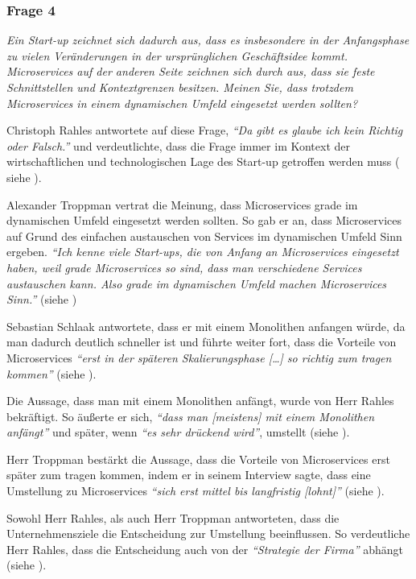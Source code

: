\subsubsection{Frage 4}

\textit{Ein Start-up zeichnet sich dadurch aus, dass es insbesondere in der Anfangsphase zu vielen Veränderungen in der ursprünglichen Geschäftsidee kommt. Microservices auf der anderen Seite zeichnen sich durch aus, dass sie feste Schnittstellen und Kontextgrenzen besitzen. Meinen Sie, dass trotzdem Microservices in einem dynamischen Umfeld eingesetzt werden sollten?}

Christoph Rahles antwortete auf diese Frage, \textit{\enquote{Da gibt es glaube ich kein Richtig oder Falsch.}} und verdeutlichte, dass die Frage immer im Kontext der wirtschaftlichen und technologischen Lage des Start-up getroffen werden muss ( siehe ).

Alexander Troppman vertrat die Meinung, dass Microservices grade im dynamischen Umfeld eingesetzt werden sollten. So gab er an, dass Microservices auf Grund des einfachen austauschen von Services im dynamischen Umfeld Sinn ergeben.
\textit{\enquote{Ich kenne viele Start-ups, die von Anfang an Microservices eingesetzt haben, weil grade Microservices so sind, dass man verschiedene Services austauschen kann. Also grade im dynamischen Umfeld machen Microservices Sinn.}} (siehe )

Sebastian Schlaak antwortete, dass er mit einem Monolithen anfangen würde, da man dadurch deutlich schneller ist und führte weiter fort, dass die Vorteile von Microservices \textit{\enquote{erst in der späteren Skalierungsphase […] so richtig zum tragen kommen}} (siehe ).

Die Aussage, dass man mit einem Monolithen anfängt, wurde von Herr Rahles bekräftigt. So äußerte er sich, \textit{\enquote{dass man [meistens] mit einem Monolithen anfängt}} und später, wenn \textit{\enquote{es sehr drückend wird}}, umstellt (siehe ).

Herr Troppman bestärkt die Aussage, dass die Vorteile von Microservices erst später zum tragen kommen, indem er in seinem Interview sagte, dass eine Umstellung zu Microservices \textit{\enquote{sich erst mittel bis langfristig [lohnt]}} (siehe ).

Sowohl Herr Rahles, als auch Herr Troppman antworteten, dass die Unternehmensziele die Entscheidung zur Umstellung beeinflussen. So verdeutliche Herr Rahles, dass die Entscheidung auch von der \textit{\enquote{Strategie der Firma}} abhängt (siehe ).


